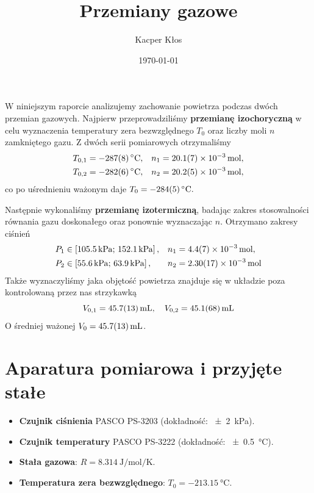 \documentclass[12pt]{article}
\title{Przemiany gazowe}
\author{Kacper Kłos}
\date{\today}
\begin{document}
\maketitle

W niniejszym raporcie analizujemy zachowanie powietrza podczas dwóch przemian gazowych. 
Najpierw przeprowadziliśmy \textbf{przemianę izochoryczną} w celu wyznaczenia temperatury zera bezwzględnego \(T_0\) oraz liczby moli \(n\) zamkniętego gazu. Z dwóch serii pomiarowych otrzymaliśmy
\begin{align*}
  T_{0,1} &= \SI{-287\pm 8}{\celsius}, & n_1 &= \SI{20.1\pm0.7e-3}{\mole},\\
  T_{0,2} &= \SI{-282\pm 6}{\celsius}, & n_2 &= \SI{20.2\pm0.5e-3}{\mole},
\end{align*}
co po uśrednieniu ważonym daje \(T_0 = \SI{-284\pm 5}{\celsius}.\)

Następnie wykonaliśmy \textbf{przemianę izotermiczną}, badając zakres stosowalności równania gazu doskonałego oraz ponownie wyznaczając \(n\). Otrzymano zakresy ciśnień
\begin{align*}
  P_1 &\in \left[\SI{105.5}{\kilo\pascal};\,\SI{152.1}{\kilo\pascal}\right], &
  n_1 &= \SI{4.4\pm0.7e-3}{\mole},\\
  P_2 &\in \left[\SI{55.6}{\kilo\pascal};\,\SI{63.9}{\kilo\pascal}\right], &
  n_2 &= \SI{2.30\pm0.17e-3}{\mole}
\end{align*}
Także wyznaczyliśmy jaka objętość powietrza znajduje się w układzie poza kontrolowaną przez nas strzykawką
\[
    V_{0,1} = \SI{45.7\pm1.3}{\milli\liter}, \quad V_{0,2} = \SI{45.1\pm6.8}{\milli\liter} 
\]
O średniej ważonej \(V_0 = \SI{45.7\pm1.3}{\milli\liter}\).

\newpage
\section{Aparatura pomiarowa i przyjęte stałe}
\begin{itemize}[leftmargin=*]
  \item \textbf{Czujnik ciśnienia} PASCO PS-3203\cite{pressure} (dokładność: \SI{\pm2}{\kilo\pascal}).
  \item \textbf{Czujnik temperatury} PASCO PS-3222\cite{temperature} (dokładność: \SI{\pm0.5}{\celsius}).
  \item \textbf{Stała gazowa}: \(R = \SI{8.314}{\joule\per\mole\per\kelvin}\)\cite{gas_const}.
  \item \textbf{Temperatura zera bezwzględnego}: \(T_0 = \SI{-213.15}{\celsius}\)\cite{zero}.
\end{itemize}
\end{document}
